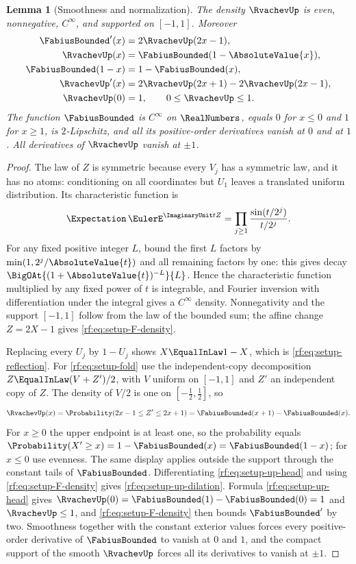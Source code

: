 \documentclass[11pt,oneside]{article}
\theoremstyle{plain}
\newtheorem{lemma}[theorem]{Lemma}
\theoremstyle{definition}
\theoremstyle{remark}
\newcommand{\Fb}{\FabiusBounded}            %
\newcommand{\up}{\RvachevUp}                %
\newcommand{\E}{\Expectation}
\newcommand{\Prob}{\Probability}
\begin{document}
\begin{lemma}[Smoothness and normalization]
\label{rf:lem:setup-normalization}
The density $\up$ is even, nonnegative, $C^{\infty}$, and supported on
$[-1,1]$.  Moreover
\begin{align}
 \Fb'(x)&=2\up(2x-1),\label{rf:eq:setup-F-density}\\
 \up(x)&=\Fb(1-\AbsoluteValue{x}),\label{rf:eq:setup-fold}\\
 \Fb(1-x)&=1-\Fb(x),\label{rf:eq:setup-reflection}\\
 \up'(x)&=2\up(2x+1)-2\up(2x-1),\label{rf:eq:setup-up-dilation}\\
 \up(0)&=1,\qquad0\le\up\le1.\label{rf:eq:setup-up-bound}
\end{align}
The function $\Fb$ is $C^{\infty}$ on $\RealNumbers$, equals $0$ for
$x\le0$ and $1$ for $x\ge1$, is $2$-Lipschitz, and all its positive-order
derivatives vanish at $0$ and at $1$.  All derivatives of $\up$ vanish at
$\pm1$.
\end{lemma}

\begin{proof}
The law of $Z$ is symmetric because every $V_{j}$ has a symmetric law, and
it has no atoms: conditioning on all coordinates but $U_{1}$ leaves a
translated uniform distribution.  Its characteristic function is
\[
 \E\,\EulerE^{\ImaginaryUnit tZ}
 =\prod_{j\ge1}\frac{\sin(t/2^{j})}{t/2^{j}}.
\]
For any fixed positive integer $L$, bound the first $L$ factors by
$\min(1,2^{j}/\AbsoluteValue{t})$ and all remaining factors by one: this
gives decay $\BigOAt{(1+\AbsoluteValue{t})^{-L}}{L}$.  Hence the
characteristic function multiplied by any fixed power of $t$ is integrable,
and Fourier inversion with differentiation under the integral gives a
$C^{\infty}$ density.  Nonnegativity and the support $[-1,1]$ follow from
the law of the bounded sum; the affine change $Z=2X-1$ gives
\cref{rf:eq:setup-F-density}.

Replacing every $U_{j}$ by $1-U_{j}$ shows $X\EqualInLaw1-X$, which is
\cref{rf:eq:setup-reflection}.  For \cref{rf:eq:setup-fold} use the
independent-copy decomposition $Z\EqualInLaw(V+Z')/2$, with $V$ uniform on
$[-1,1]$ and $Z'$ an independent copy of $Z$.  The density of $V/2$ is one on
$[-\tfrac12,\tfrac12]$, so
\begin{equation}
 \up(x)=\Prob(2x-1\le Z'\le2x+1)=\Fb(x+1)-\Fb(x).
 \label{rf:eq:setup-up-head}
\end{equation}
For $x\ge0$ the upper endpoint is at least one, so the probability equals
$\Prob(X'\ge x)=1-\Fb(x)=\Fb(1-x)$; for $x\le0$ use evenness.  The same
display applies outside the support through the constant tails of $\Fb$.
Differentiating \cref{rf:eq:setup-up-head} and using
\cref{rf:eq:setup-F-density} gives \cref{rf:eq:setup-up-dilation}.  Formula
\cref{rf:eq:setup-up-head} gives $\up(0)=\Fb(1)-\Fb(0)=1$ and $\up\le1$, and
\cref{rf:eq:setup-F-density} then bounds $\Fb'$ by two.  Smoothness together
with the constant exterior values forces every positive-order derivative of
$\Fb$ to vanish at $0$ and $1$, and the compact support of the smooth $\up$
forces all its derivatives to vanish at $\pm1$.
\end{proof}
\end{document}
